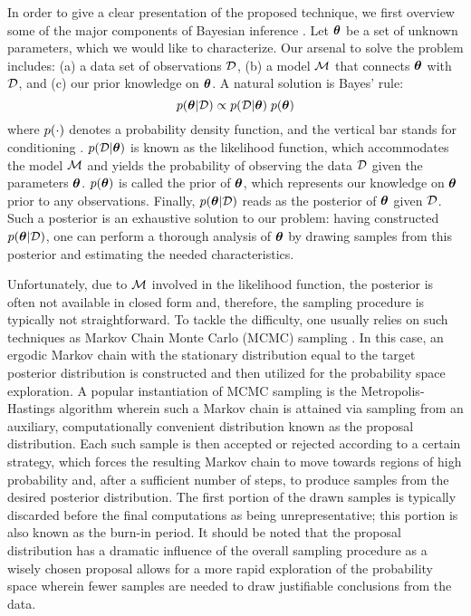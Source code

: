 In order to give a clear presentation of the proposed technique, we first overview some of the major components of Bayesian inference \cite{gelman2004}.
Let ${\boldsymbol\theta}$ be a set of unknown parameters, which we would like to characterize. Our arsenal to solve the problem includes: (a) a data set of observations $\mathcal{D}$, (b) a model $\model$ that connects ${\boldsymbol\theta}$ with $\mathcal{D}$, and (c) our prior knowledge on ${\boldsymbol\theta}$. A natural solution is Bayes' rule:
\begin{equation} \elabel{bayes}
  \f{\vparam | \Data} \propto \f{\Data | \vparam} \; \f{\vparam}
\end{equation}
where $\f{\cdot}$ denotes a probability density function, and the vertical bar stands for conditioning \cite{durrett2010}.
$\f{\Data | \vparam}$ is known as the likelihood function, which accommodates the model $\model$ and yields the probability of observing the data $\mathcal{D}$ given the parameters ${\boldsymbol\theta}$.
$\f{\vparam}$ is called the prior of ${\boldsymbol\theta}$, which represents our knowledge on ${\boldsymbol\theta}$ prior to any observations.
Finally, $\f{\vparam | \Data}$ reads as the posterior of ${\boldsymbol\theta}$ given $\mathcal{D}$. Such a posterior is an exhaustive solution to our problem: having constructed $\f{\vparam | \Data}$, one can perform a thorough analysis of ${\boldsymbol\theta}$ by drawing samples from this posterior and estimating the needed characteristics.

Unfortunately, due to $\model$ involved in the likelihood function, the posterior is often not available in closed form and, therefore, the sampling procedure is typically not straightforward.
To tackle the difficulty, one usually relies on such techniques as Markov Chain Monte Carlo (MCMC) sampling \cite{gelman2004}. In this case, an ergodic Markov chain with the stationary distribution equal to the target posterior distribution is constructed and then utilized for the probability space exploration.
A popular instantiation of MCMC sampling is the Metropolis-Hastings algorithm wherein such a Markov chain is attained via sampling from an auxiliary, computationally convenient distribution known as the proposal distribution.
Each such sample is then accepted or rejected according to a certain strategy, which forces the resulting Markov chain to move towards regions of high probability and, after a sufficient number of steps, to produce samples from the desired posterior distribution.
The first portion of the drawn samples is typically discarded before the final computations as being unrepresentative; this portion is also known as the burn-in period.
It should be noted that the proposal distribution has a dramatic influence of the overall sampling procedure as a wisely chosen proposal allows for a more rapid exploration of the probability space wherein fewer samples are needed to draw justifiable conclusions from the data.
